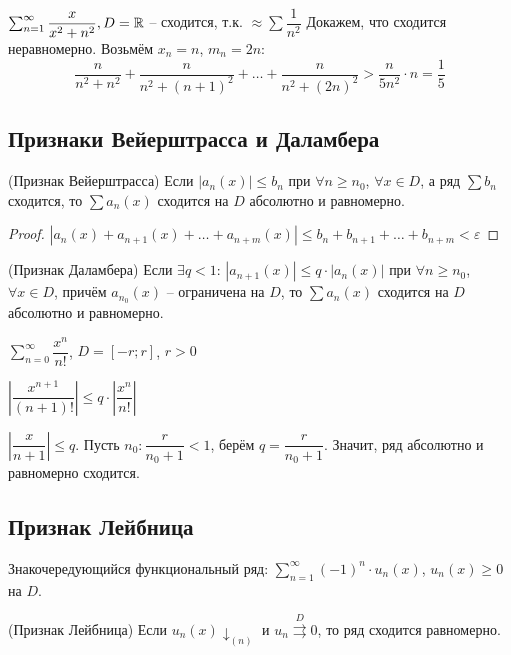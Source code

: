 \begin{example}
$\sum_{n = 1}^{\infty} \dfrac{x}{x^2 + n^2}, D = \mathbb{R}$ -- сходится, т.к. $\approx \sum \dfrac{1}{n^2}$
      Докажем, что сходится неравномерно. Возьмём $x_n = n$, $m_n = 2n$:
      $$\dfrac{n}{n^2 + n^2} + \dfrac{n}{n^2 + (n + 1)^2} + \dots + \dfrac{n}{n^2 + (2n)^2} > \dfrac{n}{5n^2} \cdot n = \dfrac{1}{5}$$
\end{example}
\subsection{Признаки Вейерштрасса и Даламбера}
\begin{theorem}
(Признак Вейерштрасса) Если $|a_n(x)| \leq b_n$ при $\forall n \geq n_0$, $\forall x \in D$, а ряд $\sum b_n$ сходится, то $\sum a_n(x)$ сходится на $D$ абсолютно и равномерно.
\end{theorem}

\begin{proof}
$|a_n(x) + a_{n + 1}(x) + \dots + a_{n + m}(x)| \leq b_n + b_{n+1} + \dots + b_{n + m} < \varepsilon$
\end{proof}

\begin{theorem}
(Признак Даламбера) Если $\exists q < 1$: $|a_{n+1}(x)| \leq q \cdot |a_n(x)|$ при $\forall n \geq n_0$, $\forall x \in D$, причём $a_{n_0}(x)$ -- ограничена на $D$, то $\sum a_n(x)$ сходится на $D$ абсолютно и равномерно.
\end{theorem}

\begin{example}
$\sum_{n = 0}^{\infty} \dfrac{x^n}{n!}$, $D=[-r; r]$, $r > 0$

$\left|\dfrac{x^{n + 1}}{(n + 1)!}\right| \leq q \cdot \left|\dfrac{x^n}{n!}\right|$

$\left|\dfrac{x}{n + 1}\right| \leq q$. Пусть $n_0: \dfrac{r}{n_0 + 1} < 1$, берём $q = \dfrac{r}{n_0 + 1}$. Значит, ряд абсолютно и равномерно сходится.
\end{example}

\subsection{Признак Лейбница}

Знакочередующийся функциональный ряд: $\sum_{n=1}^{\infty} (-1)^n \cdot u_n(x)$, $u_n(x) \geq 0$ на $D$.

\begin{theorem}
(Признак Лейбница) Если $u_n(x) \downarrow_{(n)}$ и $u_n \overset{D}{\rightrightarrows} 0$, то ряд сходится равномерно.
\end{theorem}

